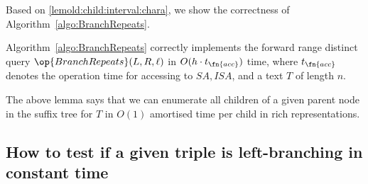 Based on \cref{lemold:child:interval:chara}, we show the correctness of Algorithm~\ref{algo:BranchRepeats}. 



\begin{lemma}
\label{lemold:algofst:BranchRepeats}
Algorithm~\ref{algo:BranchRepeats} correctly implements the forward range distinct query $\op{BranchRepeats}(L, R, \ell)$ in $O(h\cdot t_\fn{acc})$ time, where $t_\fn{acc}$ denotes the operation time for accessing to $SA, ISA$, and a text $T$ of length $n$. 
\end{lemma}

The above lemma says that we can enumerate all children of a given parent node in the suffix tree for $T$ in $O(1)$ amortised time per child in rich representations.    



\subsection{How to test if a given triple is left-branching in constant time}

